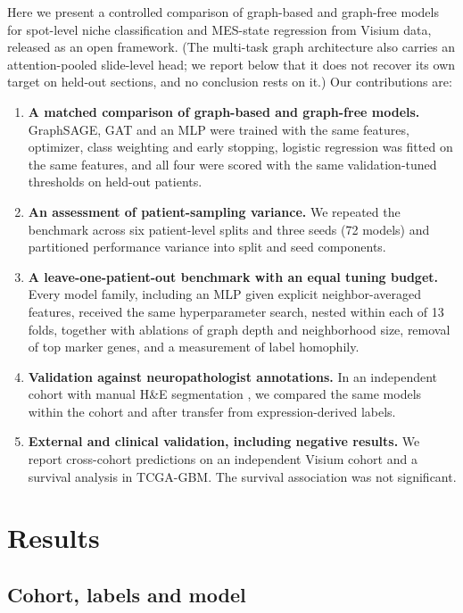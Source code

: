 \documentclass[11pt,letterpaper]{article}
\begin{document}
Here we present a controlled comparison of graph-based and graph-free models for spot-level niche classification and MES-state regression from Visium data, released as an open framework. (The multi-task graph architecture also carries an attention-pooled slide-level head; we report below that it does not recover its own target on held-out sections, and no conclusion rests on it.) Our contributions are:
\begin{enumerate}
  \item \textbf{A matched comparison of graph-based and graph-free models.} GraphSAGE, GAT and an MLP were trained with the same features, optimizer, class weighting and early stopping, logistic regression was fitted on the same features, and all four were scored with the same validation-tuned thresholds on held-out patients.
  \item \textbf{An assessment of patient-sampling variance.} We repeated the benchmark across six patient-level splits and three seeds (72 models) and partitioned performance variance into split and seed components.
  \item \textbf{A leave-one-patient-out benchmark with an equal tuning budget.} Every model family, including an MLP given explicit neighbor-averaged features, received the same hyperparameter search, nested within each of 13 folds, together with ablations of graph depth and neighborhood size, removal of top marker genes, and a measurement of label homophily.
  \item \textbf{Validation against neuropathologist annotations.} In an independent cohort with manual H\&E segmentation \cite{ravi2022,ritter2025}, we compared the same models within the cohort and after transfer from expression-derived labels.
  \item \textbf{External and clinical validation, including negative results.} We report cross-cohort predictions on an independent Visium cohort and a survival analysis in TCGA-GBM. The survival association was not significant.
\end{enumerate}

\section{Results}

\subsection{Cohort, labels and model}
\end{document}

